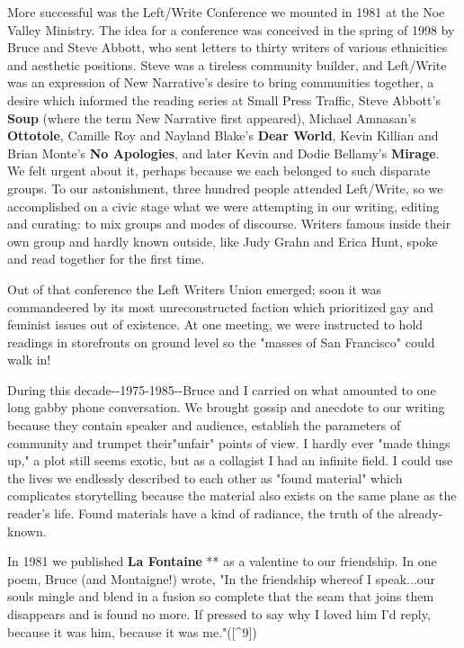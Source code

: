 More successful was the Left/Write Conference we mounted in 1981 at the
Noe Valley Ministry. The idea for a conference was conceived in the
spring of 1998 by Bruce and Steve Abbott, who sent letters to thirty
writers of various ethnicities and aesthetic positions. Steve was a
tireless community builder, and Left/Write was an expression of New
Narrative's desire to bring communities together, a desire which
informed the reading series at Small Press Traffic, Steve Abbott's
\textbf{Soup} (where the term New Narrative first appeared), Michael
Amnasan's \textbf{Ottotole}, Camille Roy and Nayland Blake's
\textbf{Dear World}, Kevin Killian and Brian Monte's \textbf{No
Apologies}, and later Kevin and Dodie Bellamy's \textbf{Mirage}. We felt
urgent about it, perhaps because we each belonged to such disparate
groups. To our astonishment, three hundred people attended Left/Write,
so we accomplished on a civic stage what we were attempting in our
writing, editing and curating: to mix groups and modes of discourse.
Writers famous inside their own group and hardly known outside, like
Judy Grahn and Erica Hunt, spoke and read together for the first time.

Out of that conference the Left Writers Union emerged; soon it was
commandeered by its most unreconstructed faction which prioritized gay
and feminist issues out of existence. At one meeting, we were instructed
to hold readings in storefronts on ground level so the "masses of San
Francisco" could walk in!

During this decade-\/-1975-1985-\/-Bruce and I carried on what amounted
to one long gabby phone conversation. We brought gossip and anecdote to
our writing because they contain speaker and audience, establish the
parameters of community and trumpet their"unfair" points of view. I
hardly ever "made things up," a plot still seems exotic, but as a
collagist I had an infinite field. I could use the lives we endlessly
described to each other as "found material" which complicates
storytelling because the material also exists on the same plane as the
reader's life. Found materials have a kind of radiance, the truth of the
already-known.

In 1981 we published \textbf{La Fontaine} ** as a valentine to our
friendship. In one poem, Bruce (and Montaigne!) wrote, "In the
friendship whereof I speak...our souls mingle and blend in a fusion so
complete that the seam that joins them disappears and is found no more.
If pressed to say why I loved him I'd reply, because it was him, because
it was me."({[}\^{}9{]})

